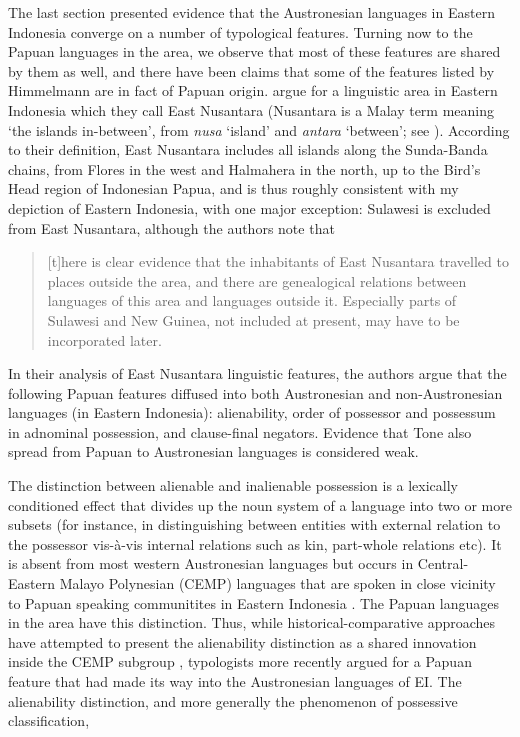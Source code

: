 The last section presented evidence that the Austronesian languages in Eastern Indonesia converge on a number of typological features. Turning now to the Papuan languages in the area, we observe that most of these features are shared by them as well, and there have been claims that some of the features listed by Himmelmann are in fact of Papuan origin. \citet{klamer2008east} argue for a linguistic area in Eastern Indonesia which they call East Nusantara (Nusantara is a Malay term meaning `the islands in-between', from \textit{nusa} `island' and \textit{antara} `between'; see \citealt[99]{klamer2008east}). According to their definition, East Nusantara includes all islands along the Sunda-Banda chains, from Flores in the west and Halmahera in the north, up to the Bird's Head region of Indonesian Papua, and is thus roughly consistent with my depiction of Eastern Indonesia, with one major exception: Sulawesi is excluded from East Nusantara, although the authors note that 

\begin{quote}[t]here is clear evidence that the inhabitants of East Nusantara travelled to places outside the area, and there are genealogical relations between languages of this area and languages outside it. Especially parts of Sulawesi and New Guinea, not included at present, may have to be incorporated later.\end{quote}

In their analysis of East Nusantara linguistic features, the authors argue that the following Papuan features diffused into both Austronesian and non-Austronesian languages (in Eastern Indonesia): alienability, order of possessor and possessum in adnominal possession, and clause-final negators. Evidence that Tone also spread from Papuan to Austronesian languages is considered weak.

The distinction between alienable and inalienable possession is a lexically conditioned effect that divides up the noun system of a language into two or more subsets (for instance, in distinguishing between entities with external relation to the possessor vis-à-vis internal relations such as kin, part-whole relations etc). It is absent from most western Austronesian languages but occurs in Central-Eastern Malayo Polynesian (CEMP) languages that are spoken in close vicinity to Papuan speaking communitites in Eastern Indonesia \citep[116]{klamer2008east}. The Papuan languages in the area have this distinction. Thus, while historical-comparative approaches have attempted to present the alienability distinction as a shared innovation inside the CEMP subgroup \citep{blust1993central}, typologists more recently argued for a Papuan feature that had made its way into the Austronesian languages of EI. The alienability distinction, and more generally the phenomenon of possessive classification,  

